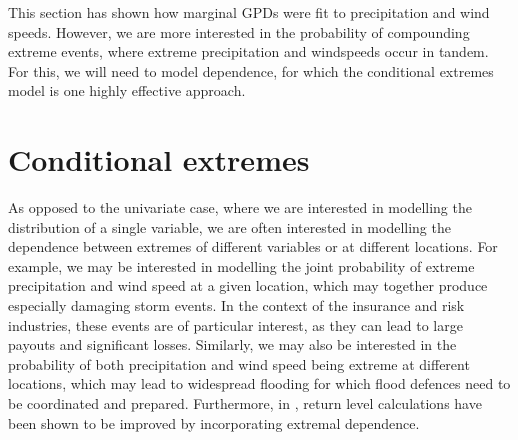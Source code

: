 \documentclass{article}
\numberwithin{equation}{section}
\begin{document}
This section has shown how marginal GPDs were fit to precipitation and wind speeds. 
However, we are more interested in the probability of compounding extreme events, where extreme precipitation and windspeeds occur in tandem.
For this, we will need to model dependence, for which the conditional extremes model is one highly effective approach.

\newpage
\section{Conditional extremes}\label{sec:ce}



As opposed to the univariate case, where we are interested in modelling the distribution of a single variable, we are often interested in modelling the dependence between extremes of different variables or at different locations.
For example, we may be interested in modelling the joint probability of extreme precipitation and wind speed at a given location, which may together produce especially damaging storm events.
In the context of the insurance and risk industries, these events are of particular interest, as they can lead to large payouts and significant losses.
Similarly, we may also be interested in the probability of both precipitation and wind speed being extreme at different locations, which may lead to widespread flooding for which flood defences need to be coordinated and prepared.
Furthermore, in \citet{Zhang2024}, return level calculations have been shown to be improved by incorporating extremal dependence.
\end{document}
